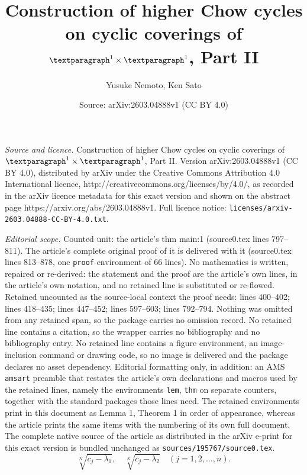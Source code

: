\documentclass[10pt,a4paper]{amsart}
\title{Construction of higher Chow cycles on cyclic coverings of $\P^1 \times \P^1$, Part II}
\author{Yusuke Nemoto, Ken Sato}
\date{Source: arXiv:2603.04888v1 (CC BY 4.0)}
\renewcommand{\l}{\lambda}
\begin{document}
\maketitle

\noindent\emph{Source and licence.} Construction of higher Chow cycles on cyclic coverings of $\P^1 \times \P^1$, Part II. Version arXiv:2603.04888v1 (CC BY 4.0), distributed by arXiv under the Creative Commons Attribution 4.0 International licence, http://creativecommons.org/licenses/by/4.0/, as recorded in the arXiv licence metadata for this exact version and shown on the abstract page https://arxiv.org/abs/2603.04888v1. Full licence notice: \texttt{licenses/arxiv-2603.04888-CC-BY-4.0.txt}.\par\smallskip

\noindent\textit{Editorial scope.} Counted unit: the article's thm main:1 (source0.tex lines 797--811). The article's complete original proof of it is delivered with it (source0.tex lines 813--878, one \texttt{proof} environment of 66 lines). No mathematics is written, repaired or re-derived: the statement and the proof are the article's own lines, in the article's own notation, and no retained line is substituted or re-flowed.  Retained uncounted as the source-local context the proof needs: lines 400--402; lines 418--435; lines 447--452; lines 597--603; lines 792--794.  Nothing was omitted from any retained span, so the package carries no omission record.  No retained line contains a citation, so the wrapper carries no bibliography and no bibliography entry.  No retained line contains a figure environment, an image-inclusion command or drawing code, so no image is delivered and the package declares no asset dependency.  Editorial formatting only, in addition: an AMS \texttt{amsart} preamble that restates the article's own declarations and macros used by the retained lines, namely the environments \texttt{lem}, \texttt{thm} on separate counters, together with the standard packages those lines need.  The retained environments print in this document as Lemma 1, Theorem 1 in order of appearance, whereas the article prints the same items with the numbering of its own full document.  The complete native source of the article as distributed in the arXiv e-print for this exact version is bundled unchanged as \texttt{sources/195767/source0.tex}.
\begin{equation}\label{chosenbranch}
\sqrt[N]{c_j-\l_1},\quad\sqrt[N]{c_j-\l_2}\quad (j=1,2,\dots,n). 
\end{equation}
\end{document}
